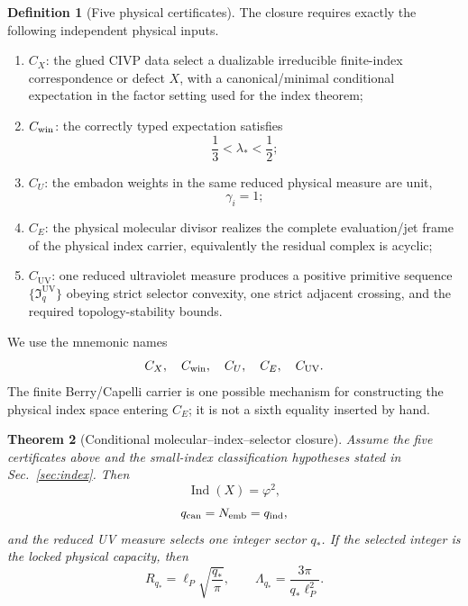 \documentclass[aps,prd,preprint,nofootinbib,superscriptaddress]{revtex4-2}
\newtheorem{theorem}{Theorem}[section]
\theoremstyle{definition}
\newtheorem{definition}[theorem]{Definition}
\theoremstyle{remark}
\newcommand{\Ind}{\operatorname{Ind}}
\newcommand{\UV}{\mathrm{UV}}
\newcommand{\cI}{\mathfrak I}
\newcommand{\PP}{\lambda_*}
\begin{document}
\begin{definition}[Five physical certificates]
The closure requires exactly the following independent physical inputs.
\begin{enumerate}[label=\textbf{C\arabic*.},leftmargin=3em]
\item \textbf{$C_X$}: the glued CIVP data select a dualizable irreducible
finite-index correspondence or defect $X$, with a canonical/minimal
conditional expectation in the factor setting used for the index theorem;
\item \textbf{$C_{\rm win}$}: the correctly typed expectation satisfies
\begin{equation}
\frac13<\PP<\frac12;
\end{equation}
\item \textbf{$C_U$}: the embadon weights in the same reduced physical measure
are unit,
\begin{equation}
\gamma_i=1;
\end{equation}
\item \textbf{$C_E$}: the physical molecular divisor realizes the complete
evaluation/jet frame of the physical index carrier, equivalently the residual
complex is acyclic;
\item \textbf{$C_{\UV}$}: one reduced ultraviolet measure produces a positive
primitive sequence $\{\cI_q^{\UV}\}$ obeying strict selector convexity, one
strict adjacent crossing, and the required topology-stability bounds.
\end{enumerate}
\end{definition}

We use the mnemonic names
\[
C_X,\quad C_{\rm win},\quad C_U,\quad C_E,\quad C_{\UV}.
\]
The finite Berry/Capelli carrier is one possible mechanism for constructing
the physical index space entering $C_E$; it is not a sixth equality inserted
by hand.

\begin{theorem}[Conditional molecular--index--selector closure]
\label{thm:closure}
Assume the five certificates above and the small-index classification
hypotheses stated in Sec.~\ref{sec:index}.  Then
\begin{equation}
\Ind(X)=\varphi^2,
\label{eq:closuregold}
\end{equation}
\begin{equation}
q_{\rm can}=N_{\rm emb}=q_{\rm ind},
\label{eq:closuretriple}
\end{equation}
and the reduced UV measure selects one integer sector $q_*$.  If the selected
integer is the locked physical capacity, then
\begin{equation}
R_{q_*}
=
\ell_P\sqrt{\frac{q_*}{\pi}},
\qquad
\Lambda_{q_*}
=
\frac{3\pi}{q_*\ell_P^2}.
\label{eq:closureds}
\end{equation}
\end{theorem}
\end{document}
